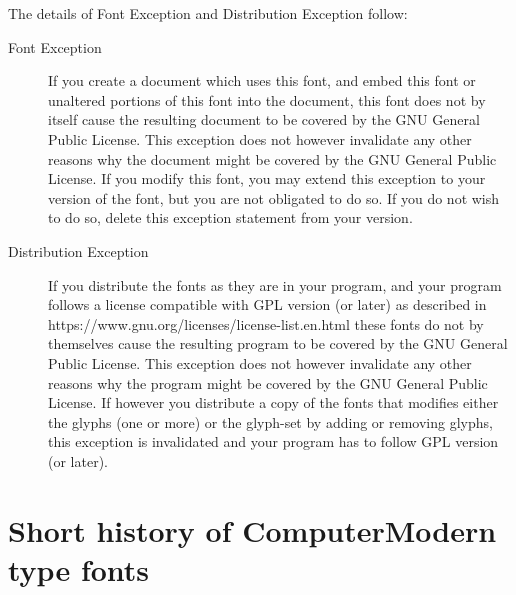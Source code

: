 \documentclass{article}
\newcommand{\ctosc}[1]{{\ctoscseries#1}}
\begin{document}
The details of Font Exception and Distribution Exception follow:
\begin{description}
\item[Font Exception] If you create a document which uses this font,
  and embed this font or unaltered portions of this font into the
  document, this font does not by itself cause the resulting document
  to be covered by the \ctosc{GNU} General Public License. This exception does
  not however invalidate any other reasons why the document might be
  covered by the \ctosc{GNU} General Public License. If you modify this font,
  you may extend this exception to your version of the font, but you
  are not obligated to do so. If you do not wish to do so, delete this
  exception statement from your version.
\item[Distribution Exception] If you distribute the fonts as they are
  in your program, and your program follows a license compatible with
  \ctosc{GPL} version  (or later) as described in
  https://www.gnu.org/licenses/license-list.en.html these fonts do not
  by themselves cause the resulting program to be covered by the \ctosc{GNU}
  General Public License. This exception does not however invalidate
  any other reasons why the program might be covered by the \ctosc{GNU}
  General Public License. If however you distribute a copy of the
  fonts that modifies either the glyphs (one or more) or the glyph-set
  by adding or removing glyphs, this exception is invalidated and your
  program has to follow \ctosc{GPL} version  (or later).
\end{description}




\section{Short history of ComputerModern type fonts}
\end{document}
